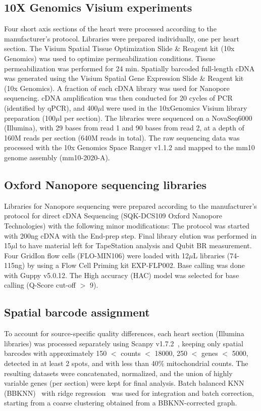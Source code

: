 \documentclass[utf8]{FrontiersinHarvard} %
\begin{document}
\subsection*{10X Genomics Visium experiments}
Four short axis sections of the heart were processed according to the manufacturer's protocol. Libraries were prepared individually, one per heart section. The Visium Spatial Tissue Optimization Slide \& Reagent kit (10x Genomics) was used to optimize permeabilization conditions. Tissue permeabilization was performed for 24 min. Spatially barcoded full-length cDNA was generated using the Visium Spatial Gene Expression Slide \& Reagent kit (10x Genomics). A fraction of each cDNA library was used for Nanopore sequencing. cDNA amplification was then conducted for 20 cycles of PCR (identified by qPCR), and 400$\mu$l were used in the 10xGenomics Visium library preparation (100$\mu$l per section). The libraries were sequenced on a NovaSeq6000 (Illumina), with 29 bases from read 1 and 90 bases from read 2, at a depth of 160M reads per section (640M reads in total). The raw sequencing data was processed with the 10x Genomics Space Ranger v1.1.2 and mapped to the mm10 genome assembly (mm10-2020-A).

\subsection*{Oxford Nanopore sequencing libraries}
Libraries for Nanopore sequencing were prepared according to the manufacturer's protocol for direct cDNA Sequencing (SQK-DCS109 Oxford Nanopore Technologies) with the following minor modifications: The protocol was started with 200ng cDNA with the End-prep step. Final library elution was performed in 15$\mu$l to have material left for TapeStation analysis and Qubit BR measurement. Four GridIon flow cells (FLO-MIN106) were loaded with 12$\mu$L libraries (74-115ng) by using a Flow Cell Priming kit EXP-FLP002. Base calling was done with Guppy v5.0.12. The High accuracy (HAC) model was selected for base calling (Q-Score cut-off $>$ 9).

\subsection*{Spatial barcode assignment}
To account for source-specific quality differences, each heart section (Illumina libraries) was processed separately using Scanpy v1.7.2~\citep{Wolf2018:scanpy}, keeping only spatial barcodes with approximately 150 $<$ counts $<$ 18000, 250 $<$ genes $<$ 5000, detected in at least 2 spots, and with less than 40\% mitochondrial counts. The resulting datasets were concatenated, normalized, and the union of highly variable genes (per section) were kept for final analysis. Batch balanced KNN (BBKNN)~\citep{Polanski2019:bbknn} with ridge regression~\citep{Park2020:thymic_atlas} was used for integration and batch correction, starting from a coarse clustering obtained from a BBKNN-corrected graph. 
\end{document}
